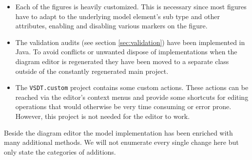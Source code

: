 \begin{itemize}
	\item Each of the figures is heavily customized. This is necessary since most figures have to adapt to the underlying model element's sub type and other attributes, enabling and disabling various markers on the figure. %
	
	
	\item The validation audits (see section \ref{sec:validation}) have been implemented in Java. To avoid conflicts or unwanted dispose of implementations when the diagram editor is regenerated they have been moved to a separate class outside of the constantly regenerated main project.
	
	\item The \verb|VSDT.custom| project contains some custom actions. These actions can be reached via the editor's context menus and provide some shortcuts for editing operations that would otherwise be very time consuming or error prone. However, this project is not needed for the editor to work.

\end{itemize}

Beside the diagram editor the model implementation has been enriched with many additional methods. We will not enumerate every single change here but only state the categories of additions.

